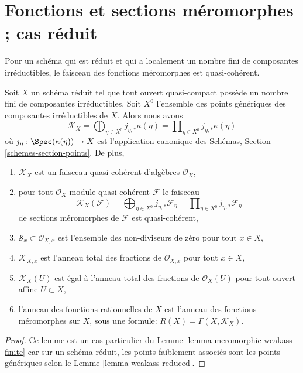 \section{Fonctions et sections méromorphes ; cas réduit}
\label{section-meromorphic-reduced}

\noindent
Pour un schéma qui est réduit et qui a localement un nombre fini de composantes
irréductibles, le faisceau des fonctions méromorphes est quasi-cohérent.

\begin{lemma}
\label{lemma-reduced-finite-irreducible}
Soit  $X$  un schéma réduit tel que tout ouvert quasi-compact possède un
nombre fini de composantes irréductibles. Soit  $X^0$  l'ensemble des points
génériques des composantes irréductibles de  $X$. Alors nous avons
$$
\mathcal{K}_X =
\bigoplus\nolimits_{\eta \in X^0} j_{\eta, *}\kappa(\eta) =
\prod\nolimits_{\eta \in X^0} j_{\eta, *}\kappa(\eta)
$$
où  $j_\eta : \Spec(\kappa(\eta)) \to X$  est l'application canonique des Schémas, Section  \ref{schemes-section-points}. De
plus,
\begin{enumerate}
\item $\mathcal{K}_X$  est un faisceau quasi-cohérent d'algèbres  $\mathcal{O}_X$,
\item pour tout  $\mathcal{O}_X$-module quasi-cohérent  $\mathcal{F}$  le faisceau
$$
\mathcal{K}_X(\mathcal{F}) =
\bigoplus\nolimits_{\eta \in X^0} j_{\eta, *}\mathcal{F}_\eta =
\prod\nolimits_{\eta \in X^0} j_{\eta, *}\mathcal{F}_\eta
$$
de sections méromorphes de  $\mathcal{F}$  est quasi-cohérent,
\item $\mathcal{S}_x \subset \mathcal{O}_{X, x}$  est l'ensemble des non-diviseurs de zéro pour tout  $x \in X$,
\item $\mathcal{K}_{X, x}$  est l'anneau total des fractions de  $\mathcal{O}_{X, x}$  pour tout
 $x \in X$,
\item $\mathcal{K}_X(U)$  est égal à l'anneau total des fractions de  $\mathcal{O}_X(U)$  pour tout
ouvert affine  $U \subset X$,
\item l'anneau des fonctions rationnelles de  $X$  est l'anneau des fonctions
méromorphes sur  $X$, sous une formule:  $R(X) = \Gamma(X, \mathcal{K}_X)$.
\end{enumerate}
\end{lemma}

\begin{proof}
Ce lemme est un cas particulier du Lemme  \ref{lemma-meromorphic-weakass-finite}  car sur un schéma réduit,
les points faiblement associés sont les points génériques selon le Lemme
 \ref{lemma-weakass-reduced}.
\end{proof}

